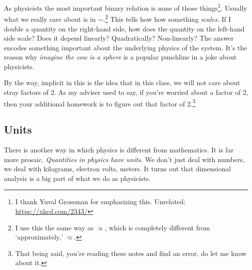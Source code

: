 As physicists the most important binary relation is none of those things\footnote{I thank Yuval Grossman for emphasizing this. Unrelated: \url{https://xkcd.com/2343/}}. Usually what we really care about is in $\sim$.\footnote{I use this the same way as $\propto$, which is completely different from `approximately,’ $\approx$.} This tells how how something \emph{scales}. If I double a quantity on the right-hand side, how does the quantity on the left-hand side scale? Does it depend linearly? Quadratically? Non-linearly? The answer encodes something important about the underlying physics of the system. It's the reason why \emph{imagine the cow is a sphere} is a popular punchline in a joke about physicists. 


By the way, implicit in this is the idea that in this class, we will not care about stray factors of 2. As my adviser used to say, if you’re worried about a factor of 2, then your additional homework is to figure out that factor of 2.\footnote{That being said, you're reading these notes and find an error, do let me know about it.} 

\subsection{Units}

There is another way in which physics is different from mathematics. It is far more prosaic. \emph{Quantities in physics have units}. We don’t just deal with numbers, we deal with kilograms, electron volts, meters. It turns out that dimensional analysis is a big part of what we do as physicists. 
